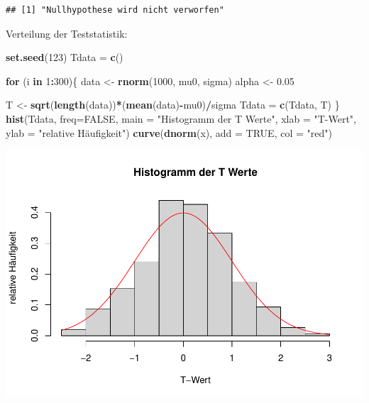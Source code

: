 \documentclass[]{article}
\newenvironment{Shaded}{\begin{snugshade}}{\end{snugshade}}
\newcommand{\ControlFlowTok}[1]{\textcolor[rgb]{0.13,0.29,0.53}{\textbf{#1}}}
\newcommand{\DataTypeTok}[1]{\textcolor[rgb]{0.13,0.29,0.53}{#1}}
\newcommand{\DecValTok}[1]{\textcolor[rgb]{0.00,0.00,0.81}{#1}}
\newcommand{\FloatTok}[1]{\textcolor[rgb]{0.00,0.00,0.81}{#1}}
\newcommand{\KeywordTok}[1]{\textcolor[rgb]{0.13,0.29,0.53}{\textbf{#1}}}
\newcommand{\NormalTok}[1]{#1}
\newcommand{\OperatorTok}[1]{\textcolor[rgb]{0.81,0.36,0.00}{\textbf{#1}}}
\newcommand{\OtherTok}[1]{\textcolor[rgb]{0.56,0.35,0.01}{#1}}
\newcommand{\StringTok}[1]{\textcolor[rgb]{0.31,0.60,0.02}{#1}}
\begin{document}
\begin{verbatim}
## [1] "Nullhypothese wird nicht verworfen"
\end{verbatim}

Verteilung der Teststatistik:

\begin{Shaded}
\begin{Highlighting}[]
\KeywordTok{set.seed}\NormalTok{(}\DecValTok{123}\NormalTok{)}
\NormalTok{Tdata =}\StringTok{ }\KeywordTok{c}\NormalTok{()}

\ControlFlowTok{for}\NormalTok{ (i }\ControlFlowTok{in} \DecValTok{1}\OperatorTok{:}\DecValTok{300}\NormalTok{)\{}
\NormalTok{  data <-}\StringTok{ }\KeywordTok{rnorm}\NormalTok{(}\DecValTok{1000}\NormalTok{, mu0, sigma)}
\NormalTok{  alpha <-}\StringTok{ }\FloatTok{0.05}

\NormalTok{  T <-}\StringTok{ }\KeywordTok{sqrt}\NormalTok{(}\KeywordTok{length}\NormalTok{(data))}\OperatorTok{*}\NormalTok{(}\KeywordTok{mean}\NormalTok{(data)}\OperatorTok{-}\NormalTok{mu0)}\OperatorTok{/}\NormalTok{sigma}
\NormalTok{  Tdata =}\StringTok{ }\KeywordTok{c}\NormalTok{(Tdata, T)}
\NormalTok{\}}
\KeywordTok{hist}\NormalTok{(Tdata, }\DataTypeTok{freq=}\OtherTok{FALSE}\NormalTok{, }\DataTypeTok{main =} \StringTok{"Histogramm der T Werte"}\NormalTok{, }\DataTypeTok{xlab =} \StringTok{"T-Wert"}\NormalTok{, }\DataTypeTok{ylab =} \StringTok{"relative Häufigkeit"}\NormalTok{)}
\KeywordTok{curve}\NormalTok{(}\KeywordTok{dnorm}\NormalTok{(x), }\DataTypeTok{add =} \OtherTok{TRUE}\NormalTok{, }\DataTypeTok{col =} \StringTok{"red"}\NormalTok{)}
\end{Highlighting}
\end{Shaded}

\includegraphics{Test_files/figure-latex/unnamed-chunk-8-1.pdf}
\end{document}
